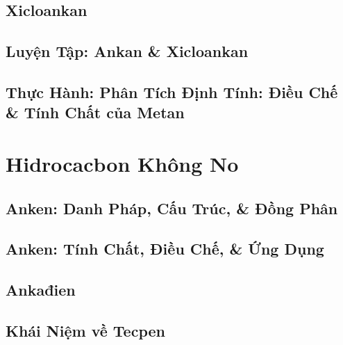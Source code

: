 \documentclass[oneside]{book}
\numberwithin{equation}{section}
\begin{document}

\section{Xicloankan}


\section{Luyện Tập: Ankan \& Xicloankan}


\section{Thực Hành: Phân Tích Định Tính: Điều Chế \& Tính Chất của Metan}


\chapter{Hidrocacbon Không No}

\section{Anken: Danh Pháp, Cấu Trúc, \& Đồng Phân}


\section{Anken: Tính Chất, Điều Chế, \& Ứng Dụng}


\section{Ankađien}


\section{Khái Niệm về Tecpen}
\end{document}
